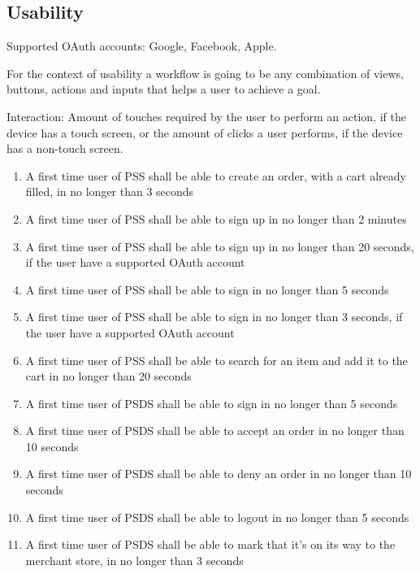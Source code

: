 \pagebreak


\subsection{Usability}
Supported OAuth accounts: Google, Facebook, Apple.
 
For the context of usability a workflow is going to be any combination of 
views, buttons, actions and inputs that helps a user to achieve a goal.

Interaction: Amount of touches required by the user to perform an action, if 
the device has a touch screen, or the amount of clicks a user performs, if the
device has a non-touch screen.

\begin{enumerate}[label=USE-\arabic*]
    \item A first time user of PSS shall be able to create an order, with a 
    cart already filled, in no longer than 3 seconds
    \item A first time user of PSS shall be able to sign up in no longer 
    than 2 minutes
    \item A first time user of PSS shall be able to sign up in no longer 
    than 20 seconds, if the user have a supported OAuth account
    \item A first time user of PSS shall be able to sign in no longer 
    than 5 seconds
    \item A first time user of PSS shall be able to sign in no longer 
    than 3 seconds, if the user have a supported OAuth account
    \item A first time user of PSS shall be able to search for an item and 
    add it to the cart in no longer than 20 seconds
    \item A first time user of PSDS shall be able to sign in no longer 
    than 5 seconds
    \item A first time user of PSDS shall be able to accept an order in no 
    longer than 10 seconds
    \item A first time user of PSDS shall be able to deny an order in no 
    longer than 10 seconds
    \item A first time user of PSDS shall be able to logout in no longer 
    than 5 seconds
    \item A first time user of PSDS shall be able to mark that it’s on its 
    way to the merchant store, in no longer than 3 seconds
\end{enumerate}

\pagebreak

